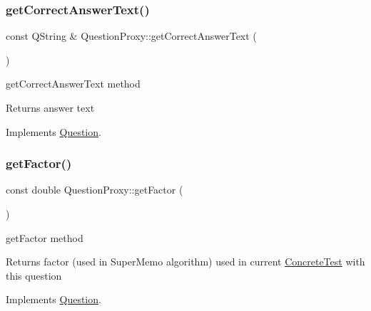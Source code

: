 \subsubsection{\texorpdfstring{get\+Correct\+Answer\+Text()}{getCorrectAnswerText()}}
{\footnotesize\ttfamily const Q\+String \& Question\+Proxy\+::get\+Correct\+Answer\+Text (\begin{DoxyParamCaption}{ }\end{DoxyParamCaption})\hspace{0.3cm}{\ttfamily [virtual]}}



get\+Correct\+Answer\+Text method 

\begin{DoxyReturn}{Returns}
answer text 
\end{DoxyReturn}


Implements \hyperlink{class_question_a3c825d4c813d2d620c46b062aef1c364}{Question}.

\mbox{\label{class_question_proxy_af3eeb645cbd04fe05418e5931e55585e}} 
\subsubsection{\texorpdfstring{get\+Factor()}{getFactor()}}
{\footnotesize\ttfamily const double Question\+Proxy\+::get\+Factor (\begin{DoxyParamCaption}{ }\end{DoxyParamCaption})\hspace{0.3cm}{\ttfamily [virtual]}}



get\+Factor method 

\begin{DoxyReturn}{Returns}
factor (used in Super\+Memo algorithm) used in current \hyperlink{class_concrete_test}{Concrete\+Test} with this question 
\end{DoxyReturn}


Implements \hyperlink{class_question_a31d98a74f4e54916d11bc2817b5518a4}{Question}.

\mbox{\label{class_question_proxy_a720f1ae28f66770e40859fd19945450c}} 
